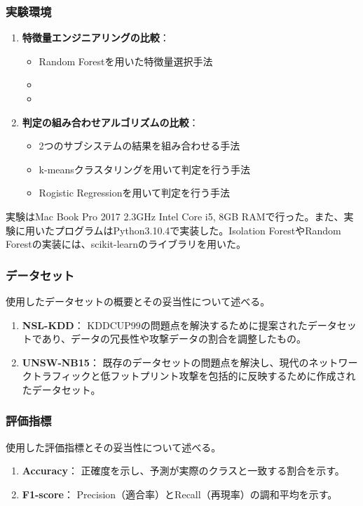 \documentclass{css}
\begin{document}
\subsubsection{実験環境}
\begin{enumerate}
    \item \textbf{特徴量エンジニアリングの比較}：
        \begin{itemize}
            \item Random Forestを用いた特徴量選択手法
            \item
            \item
        \end{itemize}
    \item \textbf{判定の組み合わせアルゴリズムの比較}：
        \begin{itemize}
            \item 2つのサブシステムの結果を組み合わせる手法
            \item k-meansクラスタリングを用いて判定を行う手法
            \item Rogistic Regressionを用いて判定を行う手法
        \end{itemize}
\end{enumerate}

実験はMac Book Pro 2017 2.3GHz Intel Core i5, 8GB RAMで行った。また、実験に用いたプログラムはPython3.10.4で実装した。Isolation ForestやRandom Forestの実装には、scikit-learnのライブラリを用いた。

\subsubsection{データセット}
使用したデータセットの概要とその妥当性について述べる。
\begin{enumerate}
    \item \textbf{NSL-KDD}：
        KDDCUP99の問題点を解決するために提案されたデータセットであり、データの冗長性や攻撃データの割合を調整したもの。
    \item \textbf{UNSW-NB15}：
        既存のデータセットの問題点を解決し、現代のネットワークトラフィックと低フットプリント攻撃を包括的に反映するために作成されたデータセット。
\end{enumerate}

\subsubsection{評価指標}
使用した評価指標とその妥当性について述べる。
\begin{enumerate}
    \item \textbf{Accuracy}：
        正確度を示し、予測が実際のクラスと一致する割合を示す。
    \item \textbf{F1-score}：
        Precision（適合率）とRecall（再現率）の調和平均を示す。
\end{enumerate}
\end{document}
